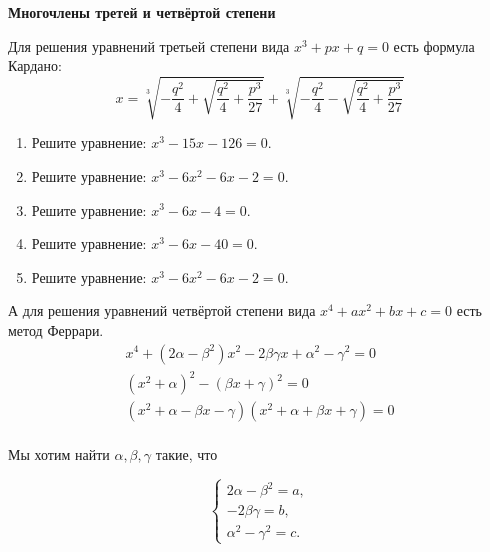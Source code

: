 \documentclass{article}
\begin{document}
    \large


    \begin{center}
        \textbf{Многочлены третей и четвёртой степени}
    \end{center}

    Для решения уравнений третьей степени вида $x^3 + px + q = 0$ есть формула Кардано:
    \[\boxed{x=\sqrt[3]{-\frac{q^2}{4} + \sqrt{\frac{q^2}{4} +\frac{p^3}{27}}} + \sqrt[3]{-\frac{q^2}{4} - \sqrt{\frac{q^2}{4} +\frac{p^3}{27}}}}\]


    \begin{enumerate}[label*=\protect\fbox{\arabic{enumi}}]

        \item Решите уравнение: $x^3 - 15 x - 126 = 0.$

        \item Решите уравнение: $x^3 - 6x^2 - 6x - 2 = 0.$

        \item Решите уравнение: $x^3 - 6x - 4 = 0.$

        \item Решите уравнение: $x^3 - 6x - 40 = 0.$

        \item Решите уравнение: $x^3 - 6x^2 - 6x - 2 = 0.$


    \end{enumerate}

    А для решения уравнений четвёртой степени вида $x^4 + ax^2+ bx + c = 0$ есть метод Феррари.
    \begin{gather*}
        x^4 + (2\alpha - \beta^2)  x^2 -2\beta\gamma x + \alpha^2- \gamma^2 = 0\\
        (x^2 + \alpha)^2 - (\beta x + \gamma)^2 = 0\\
        (x^2 + \alpha - \beta x - \gamma)(x^2 + \alpha + \beta x + \gamma) = 0\\
    \end{gather*}

    Мы хотим найти $\alpha, \beta, \gamma$ такие, что

    \begin{equation*}
        \begin{cases}
            2\alpha - \beta^2 = a,
            \\
            -2\beta\gamma = b,
            \\
            \alpha^2- \gamma^2 = c.
        \end{cases}
    \end{equation*}
\end{document}
